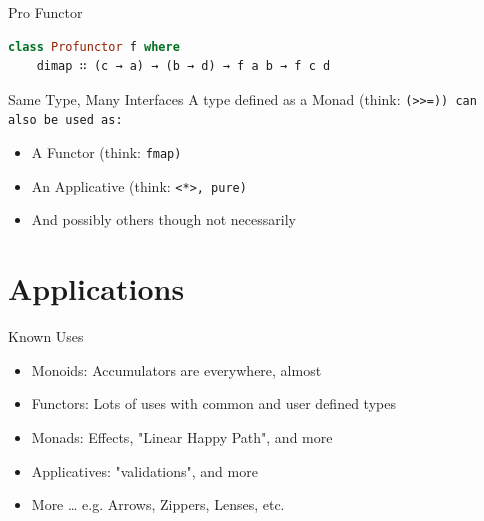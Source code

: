 \documentclass[compress]{beamer}
\begin{document}
\begin{frame}[containsverbatim]{Pro Functor}
\begin{lstlisting}[language=haskell]
class Profunctor f where
    dimap ∷ (c → a) → (b → d) → f a b → f c d
\end{lstlisting}
\end{frame}

\begin{frame}{Same Type, Many Interfaces}
  A type defined as a Monad (think: \tt{(>>=)}) can also be used as:
  \begin{itemize}
    \item \Large{A Functor (think: \tt{fmap})} \newline
    \item \Large{An Applicative (think: \tt{<*>, pure})} \newline
    \item \Large{And possibly others} \small{though not necessarily}
  \end{itemize}
\end{frame}

\section{Applications}

\begin{frame}{Known Uses}
\begin{itemize}
  \item \Large{Monoids:} \small{Accumulators are everywhere, almost} \newline
  \item \Large{Functors:} \small{Lots of uses with common and user defined types} \newline
  \item \Large{Monads:} \small{Effects, "Linear Happy Path", and more} \newline
  \item \Large{Applicatives:} \small{"validations", and more} \newline
  \item \Large{More \ldots} \small{e.g. Arrows, Zippers, Lenses, etc.}
\end{itemize}
\end{frame}
\end{document}
